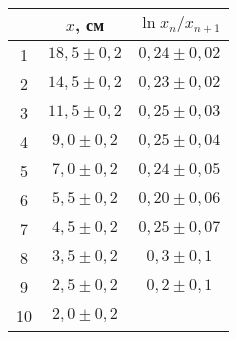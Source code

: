 \begin{tabular}{ccc}
\toprule
 & $x$, см & $\ln{x_n/x_{n+1}}$ \\
\midrule
1 & $18,5 \pm 0,2$ & $0,24 \pm 0,02$ \\
2 & $14,5 \pm 0,2$ & $0,23 \pm 0,02$ \\
3 & $11,5 \pm 0,2$ & $0,25 \pm 0,03$ \\
4 & $9,0 \pm 0,2$ & $0,25 \pm 0,04$ \\
5 & $7,0 \pm 0,2$ & $0,24 \pm 0,05$ \\
6 & $5,5 \pm 0,2$ & $0,20 \pm 0,06$ \\
7 & $4,5 \pm 0,2$ & $0,25 \pm 0,07$ \\
8 & $3,5 \pm 0,2$ & $0,3 \pm 0,1$ \\
9 & $2,5 \pm 0,2$ & $0,2 \pm 0,1$ \\
10 & $2,0 \pm 0,2$ &  \\
\bottomrule
\end{tabular}